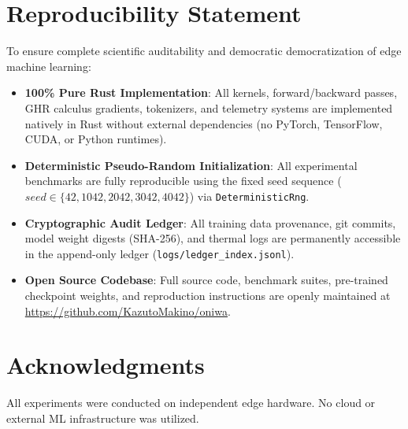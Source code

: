\documentclass[10pt,twocolumn,letterpaper]{article}
\begin{document}
\section{Reproducibility Statement}
To ensure complete scientific auditability and democratic democratization of edge machine learning:
\begin{itemize}
    \item \textbf{100\% Pure Rust Implementation}: All kernels, forward/backward passes, GHR calculus gradients, tokenizers, and telemetry systems are implemented natively in Rust without external dependencies (no PyTorch, TensorFlow, CUDA, or Python runtimes).
    \item \textbf{Deterministic Pseudo-Random Initialization}: All experimental benchmarks are fully reproducible using the fixed seed sequence ($seed \in \{42, 1042, 2042, 3042, 4042\}$) via \texttt{DeterministicRng}.
    \item \textbf{Cryptographic Audit Ledger}: All training data provenance, git commits, model weight digests (SHA-256), and thermal logs are permanently accessible in the append-only ledger (\texttt{logs/ledger\_index.jsonl}).
    \item \textbf{Open Source Codebase}: Full source code, benchmark suites, pre-trained checkpoint weights, and reproduction instructions are openly maintained at \url{https://github.com/KazutoMakino/oniwa}.
\end{itemize}

\section*{Acknowledgments}
All experiments were conducted on independent edge hardware. No cloud or external ML infrastructure was utilized.



\end{document}
